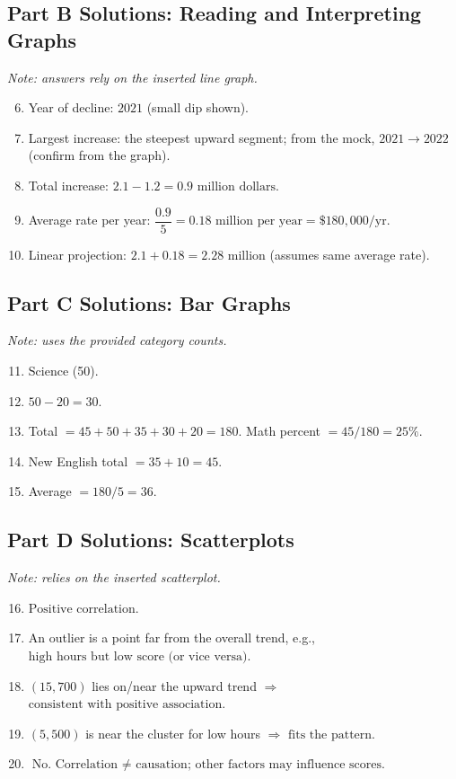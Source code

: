 \documentclass[12pt]{article}
\begin{document}
\subsection*{Part B Solutions: Reading and Interpreting Graphs}
\textit{Note: answers rely on the inserted line graph.}
\begin{enumerate}
  \setcounter{enumi}{5}
  \item Year of decline: \(\boxed{2021}\) (small dip shown).
  \item Largest increase: the steepest upward segment; from the mock, \(\boxed{2021\to 2022}\) (confirm from the graph).
  \item Total increase: \(2.1-1.2=\boxed{0.9\text{ million dollars}}\).
  \item Average rate per year: \(\dfrac{0.9}{5}=\boxed{0.18\text{ million per year}}=\boxed{\$180{,}000/\text{yr}}\).
  \item Linear projection: \(2.1+0.18=\boxed{2.28\text{ million}}\) (assumes same average rate).
\end{enumerate}

\subsection*{Part C Solutions: Bar Graphs}
\textit{Note: uses the provided category counts.}
\begin{enumerate}
  \setcounter{enumi}{10}
  \item \(\boxed{\text{Science}}\) (50).
  \item \(50-20=\boxed{30}\).
  \item Total \(=45+50+35+30+20=180\). Math percent \(=45/180= \boxed{25\%}\).
  \item New English total \(=35+10=\boxed{45}\).
  \item Average \(=180/5=\boxed{36}\).
\end{enumerate}

\subsection*{Part D Solutions: Scatterplots}
\textit{Note: relies on the inserted scatterplot.}
\begin{enumerate}
  \setcounter{enumi}{15}
  \item \(\boxed{\text{Positive correlation}}\).
  \item An outlier is a point far from the overall trend, e.g., \(\boxed{\text{high hours but low score (or vice versa)}}\).
  \item \((15,700)\) lies on/near the upward trend \(\Rightarrow\) \(\boxed{\text{consistent with positive association}}\).
  \item \((5,500)\) is near the cluster for low hours \(\Rightarrow\) \(\boxed{\text{fits the pattern}}\).
  \item \(\boxed{\text{No. Correlation }\neq\text{ causation; other factors may influence scores.}}\)
\end{enumerate}
\end{document}

